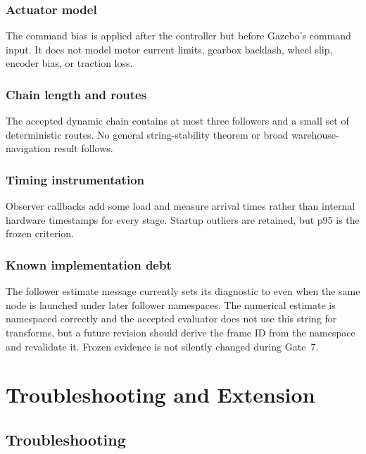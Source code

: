 \documentclass[11pt,oneside,openany]{book}
\newcommand{\file}[1]{\path{#1}}
\begin{document}
\section{Actuator model}

The command bias is applied after the controller but before Gazebo's command input. It does not model motor current limits, gearbox backlash, wheel slip, encoder bias, or traction loss.

\section{Chain length and routes}

The accepted dynamic chain contains at most three followers and a small set of deterministic routes. No general string-stability theorem or broad warehouse-navigation result follows.

\section{Timing instrumentation}

Observer callbacks add some load and measure arrival times rather than internal hardware timestamps for every stage. Startup outliers are retained, but p95 is the frozen criterion.

\section{Known implementation debt}

The follower estimate message currently sets its diagnostic \file{frame_id} to \file{follower_1/camera} even when the same node is launched under later follower namespaces. The numerical estimate is namespaced correctly and the accepted evaluator does not use this string for transforms, but a future revision should derive the frame ID from the namespace and revalidate it. Frozen evidence is not silently changed during Gate~7.

\part{Troubleshooting and Extension}

\chapter{Troubleshooting}
\end{document}
